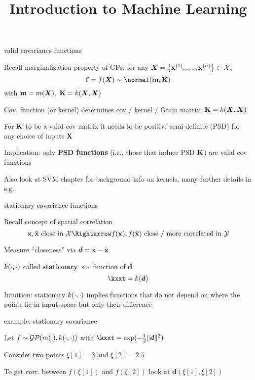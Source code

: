 \documentclass[11pt,compress,t,notes=noshow, xcolor=table]{beamer}
\title{Introduction to Machine Learning}
\begin{document}

\begin{framei}[sep=L]{valid covariance functions}
\item Recall marginalization property of GPs: for any $\bm{X} = \left\{ \mathbf{x}^{(1)}, \ldots, \mathbf{x}^{(n)}\right\} \subset \mathcal{X}$,
$$\fv = \fX \sim \Nmk$$
with $\mathbf{m} = m(\bm{X})$, $\mathbf{K} = k(\bm{X}, \bm{X})$
\item Cov. function (or kernel) determines cov / kernel / Gram matrix: $\mathbf{K} = k(\bm{X}, \bm{X})$
\item For $\mathbf{K}$ to be a valid cov matrix it needs to be positive semi-definite (PSD) for any choice of inputs $\bm{X}$
\item Implication: only \textbf{PSD functions} (i.e., those that induce PSD $\mathbf{K}$) are valid cov functions 

\item Also look at SVM chapter for background info on kernels, 
many further details in e.g. 

\end{framei}

\begin{framei}[sep=L]{stationary covariance functions}
\item Recall concept of spatial correlation
$$\xv, \xtil \text{ close in } \Xspace \Rightarrow \fx, f(\xtil) \text{ close / more correlated in } \Yspace$$
\item Measure ``closeness'' via $\bm{d} = \mathbf{x} - \tilde{\mathbf{x}}$ 
\item $k(\cdot, \cdot)$ called \textbf{stationary} $\Leftrightarrow$ function of $\bm{d}$ 
$$\kxxt = k(\bm{d})$$
\item Intuition: stationary $k(\cdot, \cdot)$ implies functions that do not depend on where the points lie in input space but only their difference 

\end{framei}

\begin{framei}{example: stationary covariance} 
\item Let $f \sim \mathcal{GP}(m(\cdot), k(\cdot, \cdot))$ with $\kxxt = \exp(-\tfrac{1}{2}\|\bm{d}\|^2)$ 
\item Consider two points $\xi[1] = 3$ and $\xi[2] = 2.5$ 
\item To get corr. between $f(\xi[1])$ and $f(\xi[2])$ look at $\bm{d}(\xi[1], \xi[2])$ 
\vfill 
{} 
\end{framei} 
\end{document}

